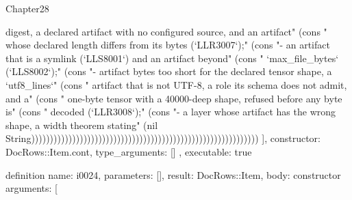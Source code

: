 \begin{lexlean}{Chapter28}
\begin{semanticmodule}
{{digest, a declared artifact with no configured source, and an artifact" (cons "  whose declared length differs from its bytes (`LLR3007`);" (cons "- an artifact that is a symlink (`LLS8001`) and an artifact beyond" (cons "  `max_file_bytes` (`LLS8002`);" (cons "- artifact bytes too short for the declared tensor shape, a `utf8_lines`" (cons "  artifact that is not UTF-8, a role its schema does not admit, and a" (cons "  one-byte tensor with a 40000-deep shape, refused before any byte is" (cons "  decoded (`LLR3008`);" (cons "- a layer whose artifact has the wrong shape, a width theorem stating" (nil String)))))))))))))))))))))))))))))))))))))))))))))))))))))))))))))
    ],
    constructor: DocRows::Item.cont,
    type_arguments: []
  },
  executable: true
}

definition{
  name: i0024,
  parameters: [],
  result: DocRows::Item,
  body: constructor{
    arguments: [
}}
\end{semanticmodule}
\end{lexlean}
